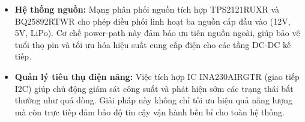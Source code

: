                     \begin{itemize}

                        \item \textbf{Hệ thống nguồn:} 
                        Mạng phân phối nguồn tích hợp TPS2121RUXR và BQ25892RTWR cho phép điều phối linh hoạt ba nguồn cấp đầu vào (12V, 5V, LiPo). Cơ chế power-path này đảm bảo ưu tiên nguồn ngoài, giúp bảo vệ tuổi thọ pin và tối ưu hóa hiệu suất cung cấp điện cho các tầng DC-DC kế tiếp.
                    
                        \item \textbf{Quản lý tiêu thụ điện năng:} 
                        Việc tích hợp IC INA230AIRGTR (giao tiếp I2C) giúp chủ động giám sát công suất và phát hiện sớm các trạng thái bất thường như quá dòng. Giải pháp này không chỉ tối ưu hiệu quả năng lượng mà còn trực tiếp đảm bảo độ tin cậy vận hành bền bỉ cho toàn hệ thống.


\end{itemize}
